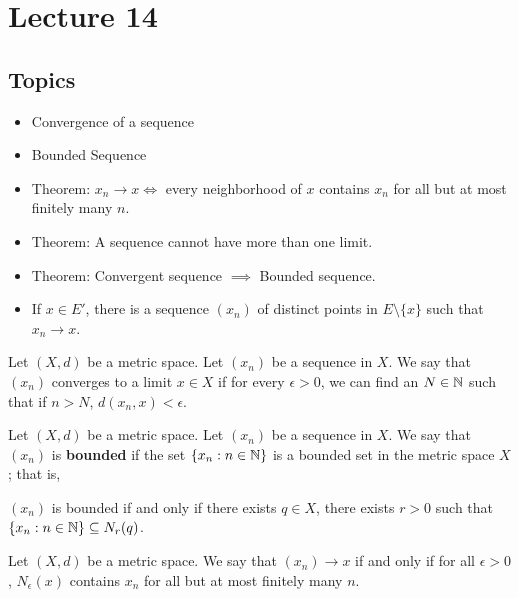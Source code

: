 \documentclass[a4paper]{book}
\begin{document}
\section{Lecture 14}

\subsection{Topics}

\begin{itemize}
    \item Convergence of a sequence
    \item Bounded Sequence
    \item Theorem: \( {x}_{n} \to x \iff \) every neighborhood of \( x  \) contains \( {x}_{n} \) for all but at most finitely many \( n \).
    \item Theorem: A sequence cannot have more than one limit.
    \item Theorem: Convergent sequence \( \implies \) Bounded sequence.
    \item If \( x \in E' \), there is a sequence \( ({x}_{n}) \) of distinct points in \( E \setminus  \{ x  \}  \) such that \( {x}_{n} \to x  \).
\end{itemize}


\begin{definition}
  Let \( (X,d) \) be a metric space. Let \( ({x}_{n}) \) be a sequence in \( X  \). We say that \( ({x}_{n}) \) converges to a limit \( x \in X  \) if for every \( \epsilon > 0  \), we can find an \( N \in \mathbb{N}  \) such that if \( n > N  \), \( d({x}_{n}, x) < \epsilon \).
\end{definition}

\begin{definition}
    Let \( (X,d) \) be a metric space. Let \( ({x}_{n}) \) be a sequence in \( X  \). We say that \( ({x}_{n}) \) is \textbf{bounded} if the set \( \{ {x}_{n} : n \in \mathbb{N}  \}  \) is a bounded set in the metric space \( X  \); that is,
    \begin{center}
        \( ({x}_{n}) \) is bounded if and only if there exists \( q \in X  \), there exists \( r > 0  \) such that \( \{ {x}_{n}: n \in \mathbb{N}  \}  \subseteq  {N}_{r}(q) \).
    \end{center}
\end{definition}


\begin{theorem}
   Let \( (X,d) \) be a metric space. We say that \( ({x}_{n}) \to x  \) if and only if for all \( \epsilon > 0  \), \( {N}_{\epsilon}(x)  \) contains \( {x}_{n}  \) for all but at most finitely many \( n \). 
\end{theorem}
\end{document}
